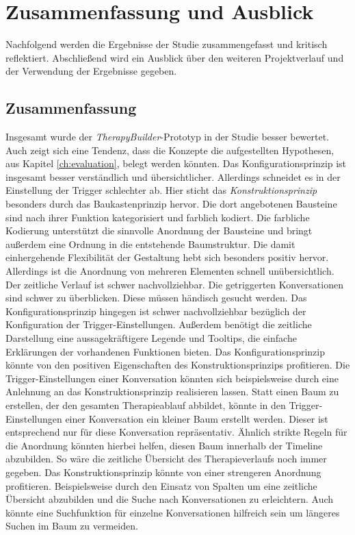 
\chapter{Zusammenfassung und Ausblick}
\label{ch:FutureWork}
%

Nachfolgend werden die Ergebnisse der Studie zusammengefasst und kritisch reflektiert. Abschließend wird ein Ausblick über den weiteren Projektverlauf und der Verwendung der Ergebnisse gegeben.

\section{Zusammenfassung}
Insgesamt wurde der \emph{TherapyBuilder}-Prototyp in der Studie besser bewertet. Auch zeigt sich eine Tendenz, dass die Konzepte die aufgestellten Hypothesen, aus Kapitel \ref{ch:evaluation}, belegt werden könnten. Das Konfigurationsprinzip ist insgesamt besser verständlich und übersichtlicher. Allerdings schneidet es in der Einstellung der Trigger schlechter ab. Hier sticht das \emph{Konstruktionsprinzip} besonders durch das Baukastenprinzip hervor. Die dort angebotenen Bausteine sind nach ihrer Funktion kategorisiert und farblich kodiert. Die farbliche Kodierung unterstützt die sinnvolle Anordnung der Bausteine und bringt außerdem eine Ordnung in die entstehende Baumstruktur. Die damit einhergehende Flexibilität der Gestaltung hebt sich besonders positiv hervor. Allerdings ist die Anordnung von mehreren Elementen schnell unübersichtlich. Der zeitliche Verlauf ist schwer nachvollziehbar. Die getriggerten Konversationen sind schwer zu überblicken. Diese müssen händisch gesucht werden. Das Konfigurationsprinzip hingegen ist schwer nachvollziehbar bezüglich der Konfiguration der Trigger-Einstellungen. Außerdem benötigt die zeitliche Darstellung eine aussagekräftigere Legende und Tooltips, die einfache Erklärungen der vorhandenen Funktionen bieten. Das Konfigurationsprinzip könnte von den positiven Eigenschaften des Konstruktionsprinzips profitieren. Die Trigger-Einstellungen einer Konversation könnten sich beispielsweise durch eine Anlehnung an das Konstruktionsprinzip realisieren lassen. Statt einen Baum zu erstellen, der den gesamten Therapieablauf abbildet, könnte in den Trigger-Einstellungen einer Konversation ein kleiner Baum erstellt werden. Dieser ist entsprechend nur für diese Konversation repräsentativ. Ähnlich strikte Regeln für die Anordnung könnten hierbei helfen, diesen Baum innerhalb der Timeline abzubilden. So wäre die zeitliche Übersicht des Therapieverlaufs noch immer gegeben. Das Konstruktionsprinzip könnte von einer strengeren Anordnung profitieren. Beispielsweise durch den Einsatz von Spalten um eine zeitliche Übersicht abzubilden und die Suche nach Konversationen zu erleichtern. Auch könnte eine Suchfunktion für einzelne Konversationen hilfreich sein um längeres Suchen im Baum zu vermeiden.

